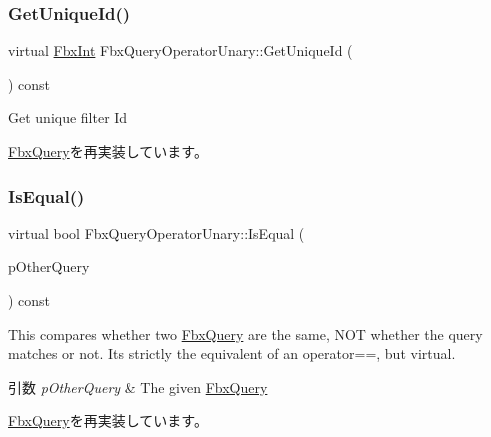 \subsubsection{\texorpdfstring{Get\+Unique\+Id()}{GetUniqueId()}}
{\footnotesize\ttfamily virtual \hyperlink{fbxtypes_8h_a088fa96de3b0b3ea69f0f6afef525dfb}{Fbx\+Int} Fbx\+Query\+Operator\+Unary\+::\+Get\+Unique\+Id (\begin{DoxyParamCaption}{ }\end{DoxyParamCaption}) const\hspace{0.3cm}{\ttfamily [virtual]}}



Get unique filter Id 



\hyperlink{class_fbx_query_ac7daae8f6fa83cd97ae24e93d7b4dc29}{Fbx\+Query}を再実装しています。

\mbox{\label{class_fbx_query_operator_unary_a36c2fea0f42bd732d559375d64b0134e}} 
\subsubsection{\texorpdfstring{Is\+Equal()}{IsEqual()}}
{\footnotesize\ttfamily virtual bool Fbx\+Query\+Operator\+Unary\+::\+Is\+Equal (\begin{DoxyParamCaption}\item[{\hyperlink{class_fbx_query}{Fbx\+Query} $\ast$}]{p\+Other\+Query }\end{DoxyParamCaption}) const\hspace{0.3cm}{\ttfamily [virtual]}}

This compares whether two \hyperlink{class_fbx_query}{Fbx\+Query} are the same, N\+OT whether the query matches or not. It\textquotesingle{}s strictly the equivalent of an operator==, but virtual. 
\begin{DoxyParams}{引数}
{\em p\+Other\+Query} & The given \hyperlink{class_fbx_query}{Fbx\+Query} \\
\hline
\end{DoxyParams}


\hyperlink{class_fbx_query_adfc24c7306ceed2fcfd8c67198e0c1dd}{Fbx\+Query}を再実装しています。

\mbox{\label{class_fbx_query_operator_unary_a4987590ec1680775240b813ec3b2ffb4}} 
